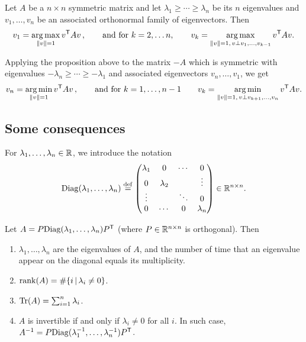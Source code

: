 \documentclass[11pt,nocut]{article}
\begin{document}
\begin{proposition}\label{prop:eigen_var}
	Let $A$ be a $n \times n$ symmetric matrix and let $\lambda_1 \geq \cdots \geq \lambda_n$ be its $n$ eigenvalues and $v_1, \dots, v_n$ be an associated orthonormal family of eigenvectors. Then 
	$$
	v_1 = \operatorname*{arg\,max}_{\|v\| = 1} v^{{\sf T}} A v\,,
	\qquad \text{and for} \ k=2, \dots n, \qquad
	v_{k} = \operatorname*{arg\,max}_{\|v\| = 1, \, v \perp v_1, \dots, v_{k-1}} v^{{\sf T}} A v.
	$$
\end{proposition}

\begin{remark} Applying the proposition above to the matrix $-A$ which is symmetric with eigenvalues $-\lambda_n \geq \cdots \geq -\lambda_1$ and associated eigenvectors $v_n, \dots, v_1$, we get
	$$
	v_n = \operatorname*{arg\,min}_{\|v\| = 1} v^{{\sf T}} A v\,,
	\qquad \text{and for} \ k=1, \dots , n-1 \qquad
	v_{k} = \operatorname*{arg\,min}_{\|v\| = 1, \, v \perp v_{k+1}, \dots, v_{n}} v^{{\sf T}} A v.
	$$
\end{remark}

\subsection{Some consequences}

For $\lambda_1, \dots, \lambda_n \in \mathbb{R}$, we introduce the notation
$$
{{\rm Diag}}(\lambda_1, \dots, \lambda_n) \overset{\rm def}{=}
\begin{pmatrix}
	\lambda_1 & 0 & \cdots & 0 \\
	0 & \lambda_2 & & \vdots \\
	\vdots & & \ddots & 0 \\
	0 & \cdots &  0 & \lambda_n
\end{pmatrix} \in \mathbb{R}^{n\times n}.
$$


\begin{proposition}
	Let $A = P {{\rm Diag}}(\lambda_1,\dots,\lambda_n) P^{{\sf T}}$ (where $P \in \mathbb{R}^{n \times n}$ is orthogonal). Then
	\begin{enumerate}
		\item $\lambda_1, \dots, \lambda_n$ are the eigenvalues of $A$, and the number of time that an eigenvalue appear on the diagonal equals its multiplicity.
		\item ${{\rm rank}}(A) = \# \{ i \, | \, \lambda_i \neq 0 \}$.
		\item ${{\rm Tr}}(A) = \sum_{i=1}^n \lambda_i$.
		\item $A$ is invertible if and only if $\lambda_i \neq 0$ for all $i$. In such case, $A^{-1} = P {{\rm Diag}}(\lambda_1^{-1}, \dots, \lambda_n^{-1}) P^{{\sf T}}$.
	\end{enumerate}
\end{proposition}
\end{document}
